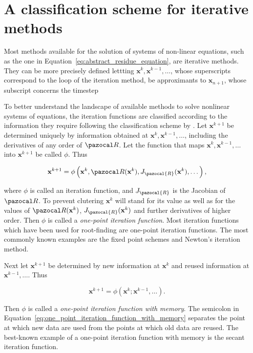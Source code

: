 
\section{A classification scheme for iterative methods}

Most methods available for the solution of systems of non-linear equations, such as the one in Equation~\eqref{eq:abstract_residue_equation}, are iterative methods.
They can be more precisely defined lettting \(\mathbf x^{k},\mathbf x^{k-1}, \ldots\), whose superscripts correspond to the loop of the iteration method, be approximants to \(\mathbf x_{n+1}\), whose subscript concerns the timestep

To better understand the landscape of available methods to solve nonlinear systems of equations, the iteration functions are classified according to the information they require following the classification scheme by \cite{traub_iterative_1982}.
Let \(\mathbf x^{k+1}\) be determined uniquely by information obtained at \(\mathbf x^{k}, \mathbf x^{k-1}, \ldots\), including the derivatives of any order of \(\pazocal R\).
Let the function that maps \(\mathbf x^{k}, \mathbf x^{k-1}, \ldots\) into \(\mathbf x^{k+1}\) be called \(\phi\).
Thus
\begin{highlight}
\begin{equation}
  \mathbf x^{k+1}=\phi\left(\mathbf x^{k},\pazocal R(\mathbf x^{k}), J_\pazocal{R}(\mathbf x^k), \dots\right),
\end{equation}
\end{highlight}
where \(\phi\) is called an iteration function, and \(J_\pazocal{R}\) is the Jacobian of \(\pazocal R\).
To prevent clutering \(\mathbf x^k\) will stand for its value as well as for the values of \(\pazocal R(\mathbf x^k)\), \(J_\pazocal{R}(\mathbf x^k)\) and further derivatives of higher order.
Then \(\phi\) is called a \textit{one-point iteration function}.
Most iteration functions which have been used for root-finding are one-point iteration functions. The most commonly known examples are the fixed point schemes and Newton's iteration method.

Next let \(\mathbf x^{k+1}\) be determined by new information at \(\mathbf x^{k}\) and reused information at \(\mathbf x^{k-1}, \ldots\).
Thus
\begin{highlight}
  \begin{equation}\label{eq:one_point_iteration_function_with_memory}
    \mathbf x^{k+1}=\phi\left(\mathbf x^{k} ; \mathbf x^{k-1}, \ldots\right) .
  \end{equation}
\end{highlight}
Then \(\phi\) is called a \textit{one-point iteration function with memory}.
The semicolon in Equation~\eqref{eq:one_point_iteration_function_with_memory} separates the point at which new data are used from the points at which old data are reused.
The best-known example of a one-point iteration function with memory is the secant iteration function.

